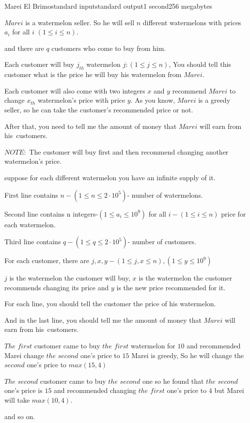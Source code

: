 \begin{problem}{Marei El Brimo}{standard input}{standard output}{1 second}{256 megabytes}

$Marei$ is a watermelon seller. So he will sell $n$ different watermelons with prices $a_i$ for all $i$ $(1 \le i \le n)$.




and there are $q$ customers who come to buy from him.




Each customer will buy $j_{th}$  watermelon $j:(1\le j\le n)$, You should tell this customer what is the price he will buy his watermelon from $Marei$.

Each customer will also come with two integers $x$ and $y$ recommend $Marei$ to change $x_{th}$ watermelon's price with price $y$. As you know, $Marei$ is a greedy seller, so he can take the customer's recommended price or not.

After that, you need to tell me the amount of money that $Marei$ will earn from his customers.

$NOTE:$ The customer will buy first and then recommend changing another watermelon's price.

suppose for each different watermelon you have an infinite supply of it.

\InputFile
First line contains $n-(1 \le n \le 2 \cdot 10^5)$- number of watermelons.

Second line contains n integers-$(1\le a_i \le 10^9)$ for all $i-(1\le i\le n)$ price for each watermelon.

Third line contains $q-(1 \le q \le 2 \cdot 10^5)$- number of customers.

For each customer, there are $j,x,y-(1\le j,x \le n),(1\le y \le 10^9)$

$j$ is the watermelon the customer will buy, $x$ is the watermelon the customer recommends changing its price and $y$ is the new price recommended for it.

\OutputFile
For each line, you should tell the customer the price of his watermelon.

And in the last line, you should tell me the amount of money that $Marei$ will earn from his customers.

\Example

\begin{example}
%
\end{example}

\Note
$The$ $first$ customer came to buy $ the$  $first$ watermelon for $10$ and recommended Marei change $the$  $second$ one's price to $15$ Marei is greedy, So he will change the $second$ one's price to $max(15,4)$


$The$ $second$ customer came to buy $the$  $second$ one so he found that $the$ 
 $second$ one's price is $15$ and recommended changing $the$ $first$ one's price to $4$ but Marei will take $max(10,4)$.

and so on.

\end{problem}

